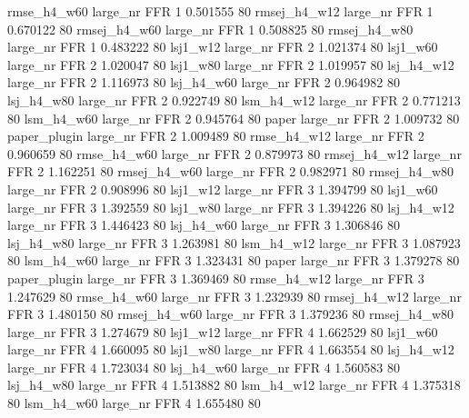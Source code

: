  rmse_h4_w60   large_nr      FFR                 1 0.501555 80
rmsej_h4_w12   large_nr      FFR                 1 0.670122 80
rmsej_h4_w60   large_nr      FFR                 1 0.508825 80
rmsej_h4_w80   large_nr      FFR                 1 0.483222 80
    lsj1_w12   large_nr      FFR                 2 1.021374 80
    lsj1_w60   large_nr      FFR                 2 1.020047 80
    lsj1_w80   large_nr      FFR                 2 1.019957 80
  lsj_h4_w12   large_nr      FFR                 2 1.116973 80
  lsj_h4_w60   large_nr      FFR                 2 0.964982 80
  lsj_h4_w80   large_nr      FFR                 2 0.922749 80
  lsm_h4_w12   large_nr      FFR                 2 0.771213 80
  lsm_h4_w60   large_nr      FFR                 2 0.945764 80
       paper   large_nr      FFR                 2 1.009732 80
paper_plugin   large_nr      FFR                 2 1.009489 80
 rmse_h4_w12   large_nr      FFR                 2 0.960659 80
 rmse_h4_w60   large_nr      FFR                 2 0.879973 80
rmsej_h4_w12   large_nr      FFR                 2 1.162251 80
rmsej_h4_w60   large_nr      FFR                 2 0.982971 80
rmsej_h4_w80   large_nr      FFR                 2 0.908996 80
    lsj1_w12   large_nr      FFR                 3 1.394799 80
    lsj1_w60   large_nr      FFR                 3 1.392559 80
    lsj1_w80   large_nr      FFR                 3 1.394226 80
  lsj_h4_w12   large_nr      FFR                 3 1.446423 80
  lsj_h4_w60   large_nr      FFR                 3 1.306846 80
  lsj_h4_w80   large_nr      FFR                 3 1.263981 80
  lsm_h4_w12   large_nr      FFR                 3 1.087923 80
  lsm_h4_w60   large_nr      FFR                 3 1.323431 80
       paper   large_nr      FFR                 3 1.379278 80
paper_plugin   large_nr      FFR                 3 1.369469 80
 rmse_h4_w12   large_nr      FFR                 3 1.247629 80
 rmse_h4_w60   large_nr      FFR                 3 1.232939 80
rmsej_h4_w12   large_nr      FFR                 3 1.480150 80
rmsej_h4_w60   large_nr      FFR                 3 1.379236 80
rmsej_h4_w80   large_nr      FFR                 3 1.274679 80
    lsj1_w12   large_nr      FFR                 4 1.662529 80
    lsj1_w60   large_nr      FFR                 4 1.660095 80
    lsj1_w80   large_nr      FFR                 4 1.663554 80
  lsj_h4_w12   large_nr      FFR                 4 1.723034 80
  lsj_h4_w60   large_nr      FFR                 4 1.560583 80
  lsj_h4_w80   large_nr      FFR                 4 1.513882 80
  lsm_h4_w12   large_nr      FFR                 4 1.375318 80
  lsm_h4_w60   large_nr      FFR                 4 1.655480 80
